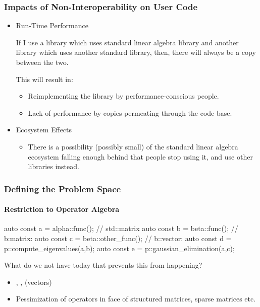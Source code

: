 \documentclass[dvipsnames,10pt]{jbeamer}
\begin{document}
\begin{frame}
  \frametitle{Impacts of Non-Interoperability on User Code}
      \begin{itemize}
        \item Run-Time Performance

            If I use a library which uses standard linear algebra library and
            another library which uses another standard library, then, there
            will always be a copy between the two.

            This will result in:
            \begin{itemize}
              \item Reimplementing the library by performance-conscious people.
              \item Lack of performance by copies permeating through the code
                base.
            \end{itemize}
    \item  Ecosystem Effects
      \begin{itemize}
        \item There is a possibility (possibly small) of the standard linear
          algebra ecosystem falling enough behind that people stop using it, and
          use other libraries instead.
      \end{itemize}
    \end{itemize}

\end{frame}

\begin{frame}[fragile]
  \frametitle{Defining the Problem Space}
  \framesubtitle{Restriction to Operator Algebra}

  \vspace{1cm}

\begin{acodecpp}{}
auto const a = alpha::func(); // std::matrix
auto const b = beta::func(); // b:matrix:
auto const c = beta::other_func(); // b::vector:
auto const d = p::compute_eigenvalues(a,b);
auto const e = p::gaussian_elimination(a,c);
\end{acodecpp}


What do we not have today that prevents this from happening?

\begin{itemize}
  \item {}, ,  (vectors)
  \item Pessimization of operators in face of structured matrices, sparse matrices etc.
\end{itemize}

\end{frame}
\end{document}
